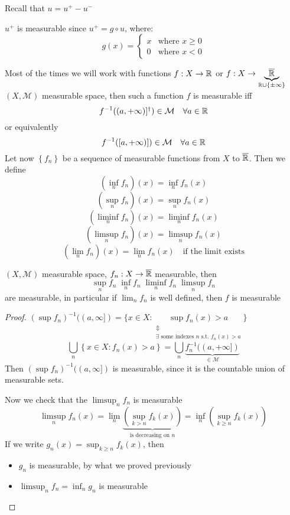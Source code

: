 Recall that \(u = u^+ - u^-\)
\begin{remark}
    \(u^+\) is measurable since \(u^+ = g\circ u\), where:
    \[
        g(x) = \begin{cases}
            x & \mbox{where } x \geq 0 \\
            0 & \mbox{where } x < 0
        \end{cases}
    \]
\end{remark}
Most of the times we will work with functions \(f: X \to \mathbb{R}\) or \(f: X \to \underbrace{\overline{\mathbb{R}}}_{\mathbb{R} \cup \left\{\pm \infty \right\}}\) 
\((X,\mathcal{M})\) measurable space, then such a  function \(f\) is measurable iff
\[
    f^{-1}((a, +\infty)]\symbolfootnotemark[2]{We use ) if \(f\) takes values in \(\real\) and ] if \(f\) takes values in \(\barreal\)}) \in \mathcal{M} \quad \forall a \in \real
\]
or equivalently
\[
    f^{-1}([a, +\infty)]) \in \mathcal{M} \quad \forall a \in \mathbb{R}
\]
Let now \(\left\lbrace f_n \right\rbrace\) be a sequence of measurable functions from \(X\) to \(\overline{\mathbb{R}}\). Then we define 
\[
    (\inf_n f_n)(x) = \inf_n f_n(x)
\]
\[
    (\sup_n f_n)(x) = \sup_n f_n(x)
\]
\[
    (\liminf_n f_n)(x) = \liminf_n f_n(x)
\]
\[
    (\limsup_n f_n)(x) = \limsup_n f_n(x)
\]
\[
    (\lim_n f_n)(x) = \lim_n f_n(x) \quad \mbox{if the limit exists}
\]
\begin{proposition}
    \((X, \mathcal{M})\) measurable space, \(f_n : X \to \overline{\mathbb{R}}\) measurable, then 
    \[\sup_n f_n \; \inf_n f_n \; \liminf_n f_n \; \limsup_n f_n\] are measurable, in particular if \(\lim_n f_n\) is well defined, then \(f\) is measurable
\end{proposition}
\begin{proof}
    \((\sup f_n)^{-1} ((a, \infty]) = \lbrace x \in X : \underset{\begin{array}{c}
        \Updownarrow \\
        \exists \mbox{ some indexes }n\mbox{ s.t. } f_n(x) > a
    \end{array}}{\sup f_n(x) > a} \rbrace\) 
    \[
        \bigcup_n \left\lbrace x \in X : f_n(x) > a \right\rbrace = \bigcup_n \underbrace{f_n^{-1}((a, +\infty])}_{\in \mathcal{M}}
    \]
    Then \((\sup f_n)^{-1} ((a, \infty])\) is measurable, since it is the countable union of measurable sets.

Now we check that the \(\limsup_n f_n\) is measurable
\[\limsup_n f_n(x) = \lim_n \underbrace{(\sup_{k > n} f_k(x))}_{\mbox{is decreasing on } n} = \inf_n (\sup_{k \geq n} f_k(x))\]
If we write \(g_n(x) = \sup_{k \geq n} f_k(x)\), then 
\begin{itemize}
    \item \(g_n\) is measurable, by what we proved previously
    \item \(\limsup_n f_n = \inf_n g_n\) is measurable
\end{itemize}
\end{proof}
